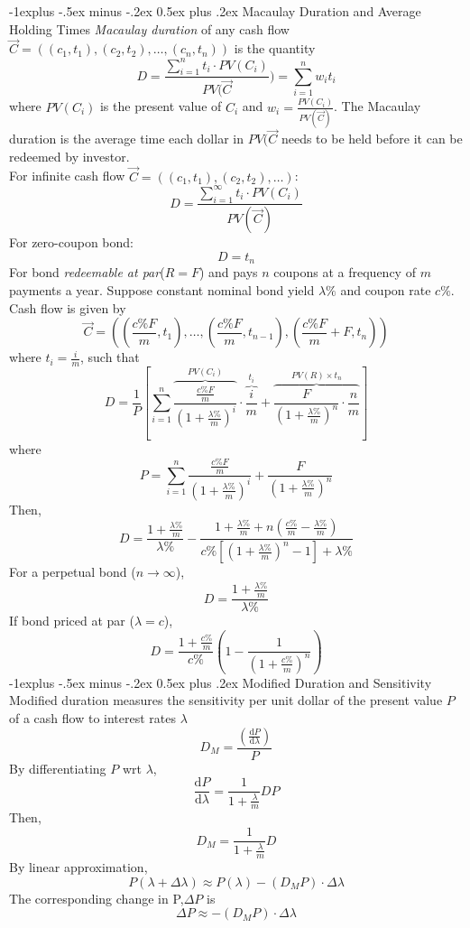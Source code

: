 \documentclass[10pt,landscape]{article}
\makeatletter
\renewcommand{\subsection}{\@startsection{subsection}{2}{0mm}%
                                {-1explus -.5ex minus -.2ex}%
                                {0.5ex plus .2ex}%
                                {\normalfont\normalsize\bfseries}}
\makeatother
\begin{document}
\begin{multicols}{3}
\subsection{Macaulay Duration and Average Holding Times}
\emph{Macaulay duration} of any cash flow $\Vec{C} = ((c_1,t_1), (c_2,t_2),\dotsc,(c_n,t_n))$ is the quantity
\[D=\frac{\displaystyle\sum_{i=1}^nt_i\cdot PV(C_i)}{PV(\Vec{C}})=\sum_{i=1}^nw_it_i\]
where $PV(C_i)$ is the present value of $C_i$ and $w_i=\frac{PV(C_i)}{PV(\Vec{C})}$. The Macaulay duration is the average time each dollar in $PV(\Vec{C}$ needs to be held before it can be redeemed by investor.\\
For infinite cash flow $\Vec{C} = ((c_1, t_1), (c_2, t_2),\dots)$:
\[D=\frac{\displaystyle\sum_{i=1}^\infty t_i\cdot PV(C_i)}{PV(\Vec{C})}\]
For zero-coupon bond:\\
\[D=t_n\]
For bond \emph{redeemable at par}($R=F$) and pays $n$ coupons at a frequency of $m$ payments a year. Suppose constant nominal bond yield $\lambda\%$ and coupon rate $c\%$. Cash flow is given by
\[\Vec{C}=\left(\left(\frac{c\%F}{m}, t_1\right),\dotsc,\left(\frac{c\%F}{m}, t_{n-1}\right),\left(\frac{c\%F}{m}+F, t_n\right)\right)\]
where $t_i=\frac{i}{m}$, such that
\[D=\frac{1}{P}\left[\displaystyle\sum_{i=1}^n\overbrace{\frac{\frac{c\%F}{m}}{\left(1+\frac{\lambda\%}{m}\right)^i}}^{PV(C_i)}\cdot\overbrace{\frac{i}{m}}^{t_i}+\overbrace{\frac{F}{\left(1+\frac{\lambda\%}{m}\right)^n}\cdot\frac{n}{m}}^{PV(R)\times t_n}\right]\]
where
\[P=\sum_{i=1}^n\frac{\frac{c\%F}{m}}{\left(1+\frac{\lambda\%}{m}\right)^i}+\frac{F}{\left(1+\frac{\lambda\%}{m}\right)^n}\]
Then,
\[D=\frac{1+\frac{\lambda\%}{m}}{\lambda\%}-\frac{1+\frac{\lambda\%}{m}+n\left(\frac{c\%}{m}-\frac{\lambda\%}{m}\right)}{c\%\left[\left(1+\frac{\lambda\%}{m}\right)^n-1\right]+\lambda\%}\]
For a perpetual bond ($n\rightarrow\infty$),
\[D=\frac{1+\frac{\lambda\%}{m}}{\lambda\%}\]
If bond priced at par ($\lambda=c$),
\[D=\frac{1+\frac{c\%}{m}}{c\%}\left(1-\frac{1}{\left(1+\frac{c\%}{m}\right)^n}\right)\]
\subsection{Modified Duration and Sensitivity}
Modified duration measures the sensitivity per unit dollar of the present value $P$ of a cash flow to interest rates $\lambda$
\[D_M=\frac{\left(\frac{\mathrm{d} P}{\mathrm{d}\lambda}\right)}{P}\]
By differentiating $P$ wrt $\lambda$,
\[\frac{\mathrm{d}P}{\mathrm{d}\lambda}=\frac{1}{1+\frac{\lambda}{m}}DP\]
Then,
\[D_M=\frac{1}{1+\frac{\lambda}{m}}D\]
By linear approximation,
\[P(\lambda+\Delta\lambda)\approx P(\lambda)-(D_MP)\cdot\Delta\lambda\]
The corresponding change in P,$\Delta P$ is
\[\Delta P\approx-(D_MP)\cdot \Delta\lambda\]
\end{multicols}
\end{document}

